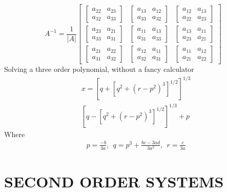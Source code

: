 \begin{multicols}{3}
$$A^{-1}= \frac{1}{|A|}\begin{bmatrix}
\begin{bmatrix} a_{22} & a_{23} \\ a_{32} & a_{33}\end{bmatrix} & \begin{bmatrix} a_{13} & a_{12} \\ a_{33} & a_{32}\end{bmatrix} & \begin{bmatrix} a_{12} & a_{13} \\ a_{22} & a_{23}\end{bmatrix} \\
\begin{bmatrix} a_{23} & a_{21} \\ a_{33} & a_{31}\end{bmatrix}& \begin{bmatrix} a_{11} & a_{13} \\ a_{31} & a_{33}\end{bmatrix} & \begin{bmatrix} a_{13} & a_{11} \\ a_{23} & a_{21}\end{bmatrix} \\
\begin{bmatrix} a_{21} & a_{22} \\ a_{31} & a_{32}\end{bmatrix} & \begin{bmatrix} a_{12} & a_{11} \\ a_{32} & a_{31}\end{bmatrix} & \begin{bmatrix} a_{11} & a_{12} \\ a_{21} & a_{22}\end{bmatrix}	
\end{bmatrix}$$
Solving a three order polynomial, without a fancy calculator
\begin{align*}
& x = \left[q + \left[ q^2 + (r-p^2)^3\right ]^{1/2} \right]^{1 /3} \\
& \left[q - \left[ q^2 + (r-p^2)^3\right ]^{1/2} \right]^{1 /3} + p
\end{align*}
Where 
\begin{align*}
& p = \frac{-b}{3a}, \ \ q =p^3 + \frac{bc-3ad}{3a^2}, \ \ r =\frac{c}{3a}
\end{align*}
\section{SECOND ORDER SYSTEMS}


\end{multicols}
